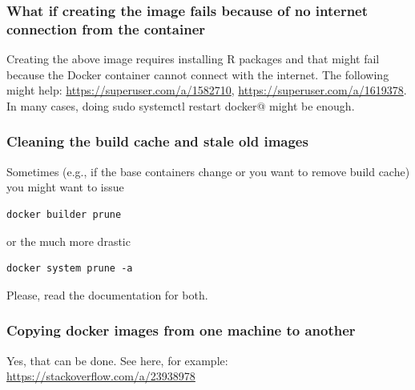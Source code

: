 \documentclass[a4paper,11pt]{article}
\begin{document}
\subsubsection{What if creating the image fails because of no internet connection from the container}
Creating the above image requires installing R packages and that might fail because the Docker container cannot connect with the internet. The following might help: \url{https://superuser.com/a/1582710}, \url{https://superuser.com/a/1619378}. In many cases, doing
\verb@ sudo systemctl restart docker@ might be enough.


\subsubsection{Cleaning the build cache and stale old images}
Sometimes (e.g., if the base containers change or you want to remove build cache) you might want to issue

\begin{verbatim}
docker builder prune
\end{verbatim}

or the much more drastic

\begin{verbatim}
docker system prune -a

\end{verbatim}
Please, read the documentation for both.



\subsubsection{Copying docker images from one machine to another}
Yes, that can be done. See here, for example: \url{https://stackoverflow.com/a/23938978}






\end{document}
